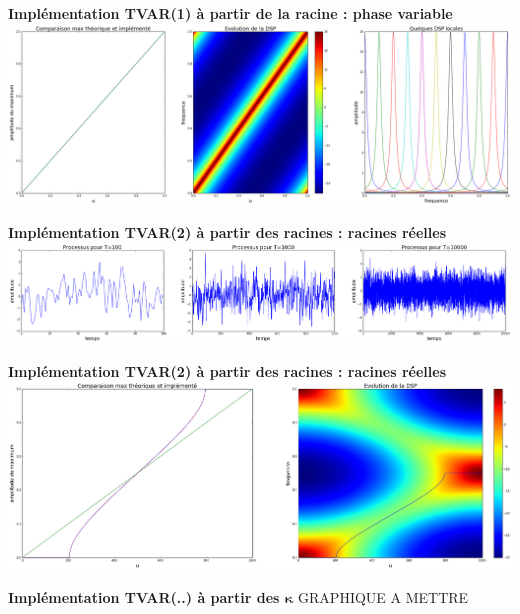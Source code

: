 \documentclass[11pt]{beamer}
\begin{document}
\begin{frame}
\textbf{Implémentation TVAR(1) à partir de la racine : phase variable}
\includegraphics[scale=0.19]{images/TVAR1_phase.png}
\end{frame}

\begin{frame}
\textbf{Implémentation TVAR(2) à partir des racines : racines réelles} 
\includegraphics[scale=0.19]{images/TVAR2_racines_reelles.png}
\end{frame}

\begin{frame}
\textbf{Implémentation TVAR(2) à partir des racines : racines réelles} 
\includegraphics[scale=0.19]{images/TVAR2_racines_conjuguees.png}
\end{frame}

\begin{frame}
\textbf{Implémentation TVAR(..) à partir des $\boldsymbol\kappa$} GRAPHIQUE A METTRE

\end{frame}
\end{document}
